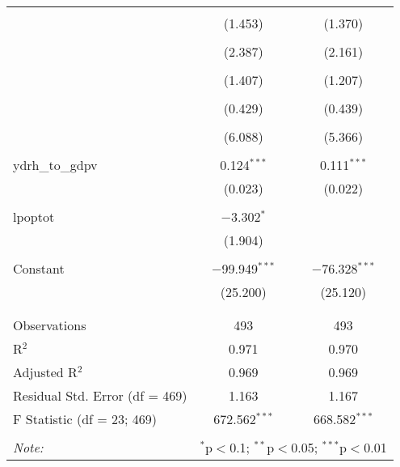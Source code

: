 \begin{table}[!htbp]
\begin{tabular}{@{\extracolsep{5pt}}lcc}
  & & \\ 

  & (1.453) & (1.370) \\ 

  & & \\ 

  & (2.387) & (2.161) \\ 

  & & \\ 

  & (1.407) & (1.207) \\ 

  & & \\ 

  & (0.429) & (0.439) \\ 

  & & \\ 

  & (6.088) & (5.366) \\ 

  & & \\ 

 ydrh\_to\_gdpv & 0.124$^{***}$ & 0.111$^{***}$ \\ 

  & (0.023) & (0.022) \\ 

  & & \\ 

 lpoptot & $-$3.302$^{*}$ &  \\ 

  & (1.904) &  \\ 

  & & \\ 

 Constant & $-$99.949$^{***}$ & $-$76.328$^{***}$ \\ 

  & (25.200) & (25.120) \\ 

  & & \\ 

\hline \\[-1.8ex] 

Observations & 493 & 493 \\ 

R$^{2}$ & 0.971 & 0.970 \\ 

Adjusted R$^{2}$ & 0.969 & 0.969 \\ 

Residual Std. Error (df = 469) & 1.163 & 1.167 \\ 

F Statistic (df = 23; 469) & 672.562$^{***}$ & 668.582$^{***}$ \\ 

\hline 

\hline \\[-1.8ex] 

\textit{Note:}  & \multicolumn{2}{r}{$^{*}$p$<$0.1; $^{**}$p$<$0.05; $^{***}$p$<$0.01} \\ 

\end{tabular} 

\end{table} 



